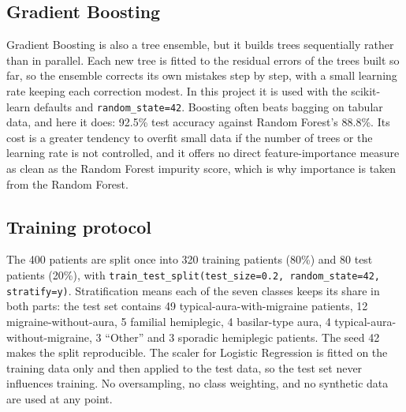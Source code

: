 \documentclass[conference]{IEEEtran}
\begin{document}
\subsection{Gradient Boosting}
Gradient Boosting is also a tree ensemble, but it builds trees sequentially rather than in parallel. Each new tree is fitted to the residual errors of the trees built so far, so the ensemble corrects its own mistakes step by step, with a small learning rate keeping each correction modest. In this project it is used with the scikit-learn defaults and \texttt{random\_state=42}. Boosting often beats bagging on tabular data, and here it does: 92.5\% test accuracy against Random Forest's 88.8\%. Its cost is a greater tendency to overfit small data if the number of trees or the learning rate is not controlled, and it offers no direct feature-importance measure as clean as the Random Forest impurity score, which is why importance is taken from the Random Forest.

\subsection{Training protocol}
The 400 patients are split once into 320 training patients (80\%) and 80 test patients (20\%), with \texttt{train\_test\_split(test\_size=0.2, random\_state=42, stratify=y)}. Stratification means each of the seven classes keeps its share in both parts: the test set contains 49 typical-aura-with-migraine patients, 12 migraine-without-aura, 5 familial hemiplegic, 4 basilar-type aura, 4 typical-aura-without-migraine, 3 ``Other'' and 3 sporadic hemiplegic patients. The seed 42 makes the split reproducible. The scaler for Logistic Regression is fitted on the training data only and then applied to the test data, so the test set never influences training. No oversampling, no class weighting, and no synthetic data are used at any point.
\end{document}
